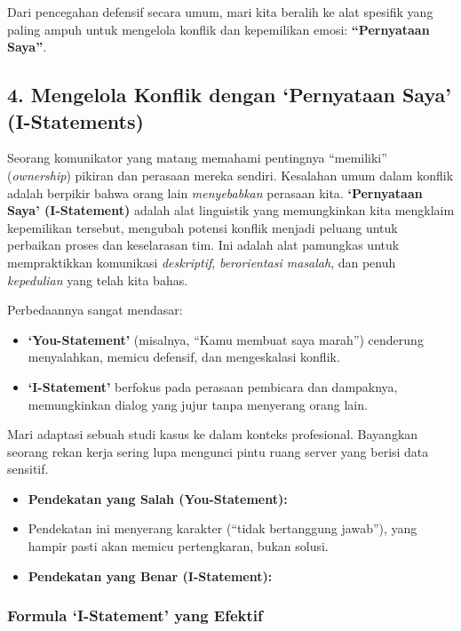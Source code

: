 \documentclass[
  letterpaper,
  DIV=11,
  numbers=noendperiod]{scrreprt}
\begin{document}
Dari pencegahan defensif secara umum, mari kita beralih ke alat spesifik
yang paling ampuh untuk mengelola konflik dan kepemilikan emosi:
\textbf{``Pernyataan Saya''}.

\subsection{4. Mengelola Konflik dengan `Pernyataan Saya'
(I-Statements)}\label{mengelola-konflik-dengan-pernyataan-saya-i-statements}

Seorang komunikator yang matang memahami pentingnya ``memiliki''
(\emph{ownership}) pikiran dan perasaan mereka sendiri. Kesalahan umum
dalam konflik adalah berpikir bahwa orang lain \emph{menyebabkan}
perasaan kita. \textbf{`Pernyataan Saya' (I-Statement)} adalah alat
linguistik yang memungkinkan kita mengklaim kepemilikan tersebut,
mengubah potensi konflik menjadi peluang untuk perbaikan proses dan
keselarasan tim. Ini adalah alat pamungkas untuk mempraktikkan
komunikasi \emph{deskriptif}, \emph{berorientasi masalah}, dan penuh
\emph{kepedulian} yang telah kita bahas.

Perbedaannya sangat mendasar:

\begin{itemize}
\item
  \textbf{`You-Statement'} (misalnya, ``Kamu membuat saya marah'')
  cenderung menyalahkan, memicu defensif, dan mengeskalasi konflik.
\item
  \textbf{`I-Statement'} berfokus pada perasaan pembicara dan dampaknya,
  memungkinkan dialog yang jujur tanpa menyerang orang lain.
\end{itemize}

Mari adaptasi sebuah studi kasus ke dalam konteks profesional. Bayangkan
seorang rekan kerja sering lupa mengunci pintu ruang server yang berisi
data sensitif.

\begin{itemize}
\item
  \textbf{Pendekatan yang Salah (You-Statement):}
\item
  Pendekatan ini menyerang karakter (``tidak bertanggung jawab''), yang
  hampir pasti akan memicu pertengkaran, bukan solusi.
\item
  \textbf{Pendekatan yang Benar (I-Statement):}
\end{itemize}

\subsubsection{\texorpdfstring{\textbf{Formula `I-Statement' yang
Efektif}}{Formula `I-Statement' yang Efektif}}\label{formula-i-statement-yang-efektif}
\end{document}
